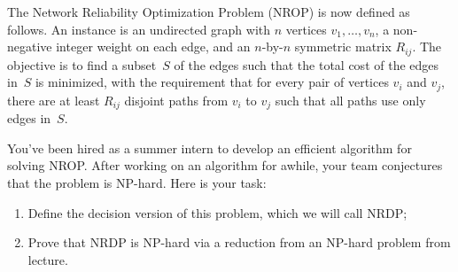 \documentclass[11pt,addpoints]{exam}
\begin{document}
\begin{questions}
  The Network Reliability Optimization Problem (NROP) is now defined as follows. An instance is an undirected graph with $n$ vertices $v_{1}, \dots, v_{n}$, a non-negative integer weight on each edge, and an $n$-by-$n$ symmetric matrix $R_{ij}$.
  The objective is to find a subset~$S$ of the edges such that the total cost of the edges in~$S$ is minimized, with the requirement that for every pair of vertices $v_i$ and $v_j$, there are at least $R_{ij}$ disjoint paths from $v_{i}$ to $v_{j}$ such that all paths use only edges in~$S$.

  You've been hired as a summer intern to develop an efficient algorithm for solving NROP.
  After working on an algorithm for awhile, your team conjectures that the problem is NP-hard.
  Here is your task:
  \begin{enumerate}
  \item Define the decision version of this problem, which we will call NRDP;
  \item Prove that NRDP is NP-hard via a reduction from an NP-hard problem from lecture.
  \end{enumerate}

  \begin{solution}
    
  \end{solution}

\end{questions}
\end{document}
